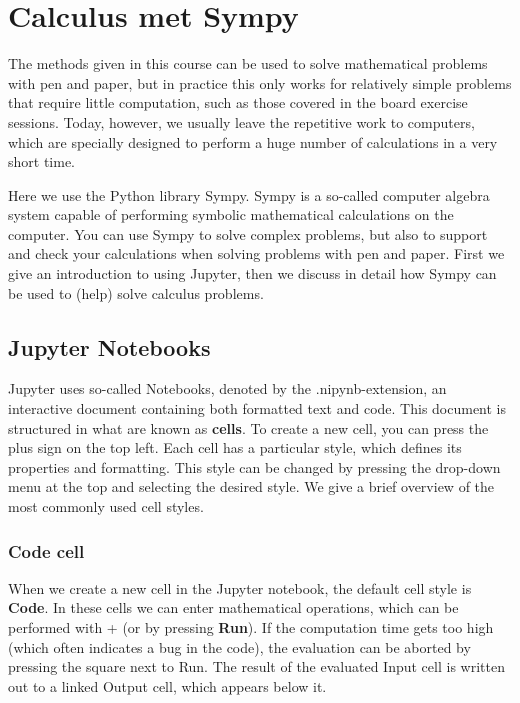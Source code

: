 \chapter{Calculus met Sympy}
\label{PC-Lab 1}
\graphicspath{{figures/Sympy/}}
The methods given in this course can be used to solve mathematical problems with pen and paper, but in practice this only works for relatively simple problems that require little computation, such as those covered in the board exercise sessions. Today, however, we usually leave the repetitive work to computers, which are specially designed to perform a huge number of calculations in a very short time.

Here we use the Python library Sympy. Sympy is a so-called computer algebra system capable of performing symbolic mathematical calculations on the computer. 
You can use Sympy to solve complex problems, but also to support and check your calculations when solving problems with pen and paper. First we give an introduction to using Jupyter, then we discuss in detail how Sympy can be used to (help) solve calculus problems.

\section{Jupyter Notebooks}
Jupyter uses so-called Notebooks, denoted by the .nipynb-extension, an interactive document containing both formatted text and code. This document is structured in what are known as \textbf{cells}. To create a new cell, you can press the plus sign on the top left.
Each cell has a particular style, which defines its properties and formatting. This style can be changed by pressing the drop-down menu at the top and selecting the desired style. We give a brief overview of the most commonly used cell styles.

\subsection{Code cell}
When we create a new cell in the Jupyter notebook, the default cell style is \textbf{Code}. In these cells we can enter mathematical operations, which can be performed with + (or by pressing \textbf{Run}). If the computation time gets too high (which often indicates a bug in the code), the evaluation can be aborted by pressing the square next to Run. The result of the evaluated Input cell is written out to a linked Output cell, which appears below it.

